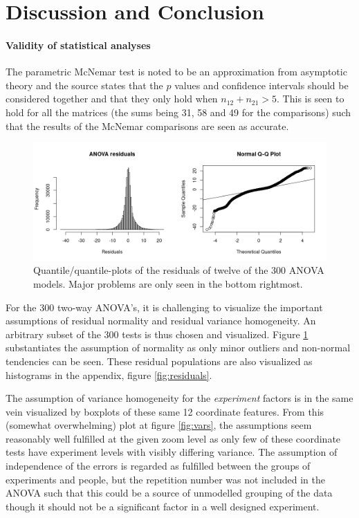 \documentclass[11pt,fleqn]{article}
\begin{document}
\section{Discussion and Conclusion}
\paragraph{Validity of statistical analyses}
The parametric McNemar test is noted to be an approximation from asymptotic theory and the source \cite{Tue} states that the \(p\) values and confidence intervals should be considered together and that they only hold when \(n_{12}+n_{21}> 5\). This is seen to hold for all the matrices (the sums being 31, 58 and 49 for the comparisons) such that the results of the McNemar comparisons are seen as accurate.
\begin{figure}[H]
	\centering
	\includegraphics[width=.9\textwidth]{qq}
	\caption{Quantile/quantile-plots of the residuals of twelve of the 300 ANOVA models. Major problems are only seen in the bottom rightmost.}\label{fig:qq}
\end{figure}\noindent
For the 300 two-way ANOVA's, it is challenging to visualize the important assumptions of residual normality and residual variance homogeneity. An arbitrary subset of the 300 tests is thus chosen and visualized. Figure \ref{fig:qq} substantiates the assumption of normality as only minor outliers and non-normal tendencies can be seen. These residual populations are also visualized as histograms in the appendix, figure \ref{fig:residuals}.

The assumption of variance homogeneity for the \textit{experiment} factors is in the same vein visualized by boxplots of these same 12 coordinate features. 
From this (somewhat overwhelming) plot at figure \ref{fig:vars}, the assumptions seem reasonably well fulfilled at the given zoom level as only few of these coordinate tests have experiment levels with visibly differing variance.  
The assumption of independence of the errors is regarded as fulfilled between the groups of experiments and people, but the repetition number was not included in the ANOVA such that this could be a source of unmodelled grouping of the data though it should not be a significant factor in a well designed experiment. 
\end{document}

